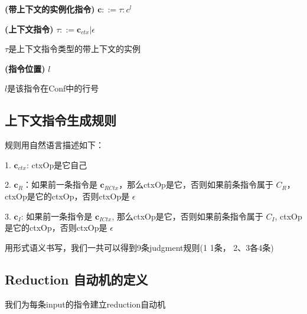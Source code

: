 \documentclass{article}
\begin{document}
\textbf{(带上下文的实例化指令)} $\textbf{c} ::=\tau: c^{l}$

\textbf{(上下文指令)} $\tau::=\textbf{c}_{ctx} | \epsilon$

$\tau$是上下文指令类型的带上下文的实例

\textbf{(指令位置)} $l$

$l$是该指令在Conf中的行号


\subsection{上下文指令生成规则}
规则用自然语言描述如下：

1. $\textbf{c}_{ctx}$: ctxOp是它自己

2. $\textbf{c}_{R}$：如果前一条指令是 $\textbf{c}_{RCtx}$，那么ctxOp是它，否则如果前条指令属于 $C_{R}$，ctxOp是它的ctxOp，否则ctxOp是 $\epsilon$

3. $\textbf{c}_{I}$: 如果前一条指令是 $\textbf{c}_{ICtx}$, 那么ctxOp是它，否则如果前条指令属于 $C_{I}$, ctxOp是它的ctxOp，否则ctxOp是 $\epsilon$

用形式语义书写，我们一共可以得到9条judgment规则(1 1条， 2、3各4条)

\subsection{Reduction 自动机的定义}
我们为每条input的指令建立reduction自动机
\end{document}

